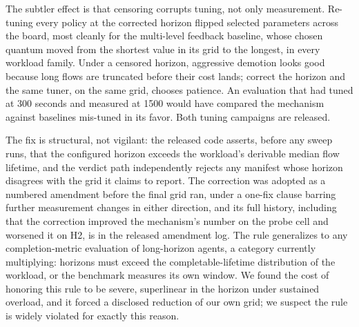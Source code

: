 The subtler effect is that censoring corrupts tuning, not only
measurement. Re-tuning every policy at the corrected horizon flipped
selected parameters across the board, most cleanly for the multi-level
feedback baseline, whose chosen quantum moved from the shortest value in
its grid to the longest, in every workload family. Under a censored
horizon, aggressive demotion looks good because long flows are truncated
before their cost lands; correct the horizon and the same tuner, on the
same grid, chooses patience. An evaluation that had tuned at 300 seconds
and measured at 1500 would have compared the mechanism against baselines
mis-tuned in its favor. Both tuning campaigns are released.

The fix is structural, not vigilant: the released code asserts, before any
sweep runs, that the configured horizon exceeds the workload's derivable
median flow lifetime, and the verdict path independently rejects any
manifest whose horizon disagrees with the grid it claims to report. The
correction was adopted as a numbered amendment before the final grid ran,
under a one-fix clause barring further measurement changes in either
direction, and its full history, including that the correction improved
the mechanism's number on the probe cell and worsened it on H2, is in the
released amendment log. The rule generalizes to any completion-metric
evaluation of long-horizon agents, a category currently multiplying:
horizons must exceed the completable-lifetime distribution of the workload,
or the benchmark measures its own window. We found the cost of honoring
this rule to be severe, superlinear in the horizon under sustained
overload, and it forced a disclosed reduction of our own grid; we suspect
the rule is widely violated for exactly this reason.
